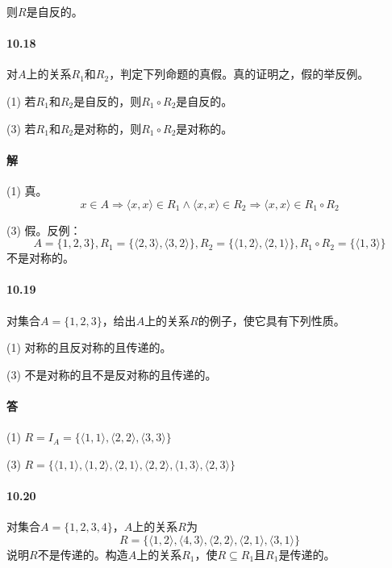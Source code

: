\documentclass[UTF8]{ctexart}
\begin{document}
        则$R$是自反的。

\paragraph{10.18} \label{10.18}
    对$A$上的关系$R_1$和$R_2$，判定下列命题的真假。真的证明之，假的举反例。

    (1) 若$R_1$和$R_2$是自反的，则$R_1 \circ R_2$是自反的。

    (3) 若$R_1$和$R_2$是对称的，则$R_1 \circ R_2$是对称的。

\paragraph{解}

    (1) 真。
    $$x \in A \Longrightarrow \langle x,x \rangle \in R_1 \land \langle x,x \rangle \in R_2 \Longrightarrow \langle x,x \rangle \in R_1 \circ R_2$$

    (3) 假。反例：$$A= \{ 1,2,3 \} , R_1= \{ \langle 2,3 \rangle , \langle 3,2 \rangle \} , R_2 = \{ \langle 1,2 \rangle , \langle 2,1 \rangle \} , R_1 \circ R_2 = \{ \langle 1,3 \rangle \} $$不是对称的。

\paragraph{10.19} \label{10.19}
    对集合$A=\{1,2,3\}$，给出$A$上的关系$R$的例子，使它具有下列性质。
    
    (1) 对称的且反对称的且传递的。

    (3) 不是对称的且不是反对称的且传递的。

\paragraph{答}

    (1) $R = I_A = \{ \langle 1,1 \rangle , \langle 2,2 \rangle , \langle 3,3 \rangle \} $

    (3) $R = \{ \langle 1,1 \rangle , \langle 1,2 \rangle , \langle 2,1 \rangle , \langle 2,2 \rangle , \langle 1,3 \rangle , \langle 2,3 \rangle \} $

\paragraph{10.20} \label{10.20}
    对集合$A= \{ 1,2,3,4 \} $，$A$上的关系$R$为
    $$R= \{ \langle 1,2 \rangle , \langle 4,3 \rangle , \langle 2,2 \rangle , \langle 2,1 \rangle , \langle 3,1 \rangle \} $$
    说明$R$不是传递的。构造$A$上的关系$R_1$，使$R\subseteq R_1$且$R_1$是传递的。
\end{document}
